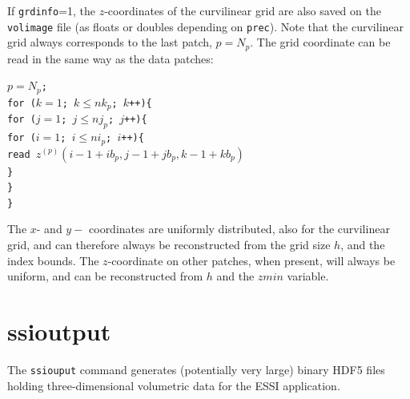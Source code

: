 \documentclass[11pt]{report}
\begin{document}
{If {\tt grdinfo}=1, the $z$-coordinates of the curvilinear grid are also saved on the \verb+volimage+ file
(as floats or doubles depending on {\tt prec}). Note that the curvilinear grid always
corresponds to the last patch, $p=N_p$. The grid coordinate can be read in the same way as
the data patches:
\begin{flushleft}
	{\tt $p=N_p$;\\
		for ($k=1$; $k\leq nk_p$; $k$++)\{\\
		\hspace{5mm}for ($j=1$; $j\leq nj_p$; $j$++)\{\\
		\hspace{10mm}for ($i=1$; $i\leq ni_p$; $i$++)\{\\
		\hspace{15mm}read $z^{(p)}(i-1+ib_p, j-1+jb_p,k-1+kb_p)$\\
		\hspace{10mm}\}\\
		\hspace{5mm}\}\\
		\}}
\end{flushleft}
The $x$- and $y-$ coordinates are uniformly distributed, also for the curvilinear grid, and can therefore always be
reconstructed from the grid size $h$, and the index bounds. The $z$-coordinate on other patches, when present, will
always be uniform, and can be reconstructed from $h$ and the $zmin$ variable.

\section{ssioutput}\label{sec:ssioutput-format}

The \verb+ssiouput+ command generates (potentially very large) binary HDF5
files holding three-dimensional volumetric data for the ESSI application.

}
\end{document}
